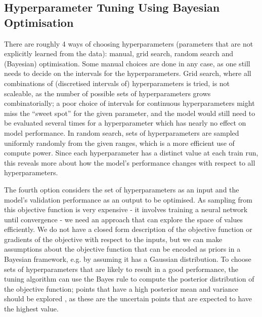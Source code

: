 \subsection{Hyperparameter Tuning Using Bayesian Optimisation}
\label{bayesian_opt}

There are roughly 4 ways of choosing hyperparameters (parameters that are not explicitly learned from the data): manual, grid search, random search and (Bayesian) optimisation.
Some manual choices are done in any case, as one still needs to decide on the intervals for the hyperparameters.
Grid search, where all combinations of (discretised intervals of) hyperparameters is tried, is not scaleable, as the number of possible sets of hyperparameters grows combinatorially; a poor choice of intervals for continuous hyperparameters might miss the ``sweet spot'' for the given parameter, and the model would still need to be evaluated several times for a hyperparameter which has nearly no effect on model performance.
In random search, sets of hyperparameters are sampled uniformly randomly from the given ranges, which is a more efficient use of compute power.
Since each hyperparameter has a distinct value at each train run, this reveals more about how the model's performance changes with respect to all hyperparameters.

The fourth option considers the set of hyperparameters as an input and the model's validation performance as an output to be optimised.
As sampling from this objective function is very expensive - it involves training a neural network until convergence - we need an approach that can explore the space of values efficiently.
We do not have a closed form description of the objective function or gradients of the objective with respect to the inputs, but we can make assumptions about the objective function that can be encoded as priors in a Bayesian framework, e.g. by assuming it has a Gaussian distribution.
To choose sets of hyperparameters that are likely to result in a good performance, the tuning algorithm can use the Bayes rule to compute the posterior distribution of the objective function; points that have a high posterior mean and variance should be explored \cite{bayesian}, as these are the uncertain points that are expected to have the highest value.
